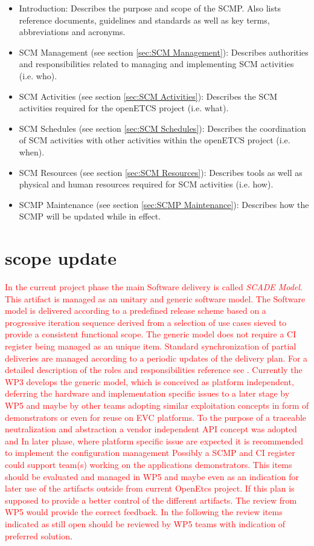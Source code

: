 \documentclass{template/openetcs_report}
\begin{document}
\vspace{-10pt}
\begin{itemize}
\item Introduction: Describes the purpose and scope of the SCMP. Also lists reference documents, guidelines and standards as well as key terms, abbreviations and acronyms.
\item SCM Management (see section \ref{sec:SCM Management}): Describes authorities and responsibilities related to managing and implementing SCM activities (i.e. who).
\item SCM Activities (see section \ref{sec:SCM Activities}): Describes the SCM activities required for the openETCS project (i.e. what).
\item SCM Schedules (see section \ref{sec:SCM Schedules}): Describes the coordination of SCM activities with other activities within the openETCS project (i.e. when).
\item SCM Resources (see section \ref{sec:SCM Resources}): Describes tools as well as physical and human resources required for SCM activities (i.e. how).
\item SCMP Maintenance (see section \ref{sec:SCMP Maintenance}): Describes how the SCMP will be updated while in effect.
\end{itemize}


\section{scope update}
\textcolor{red}{
In the current project phase the main Software delivery is called \emph{ SCADE Model}. This artifact is managed as an unitary and generic software model. The Software model is delivered according to a predefined release scheme based on a progressive iteration sequence derived from a selection of use cases sieved to provide a consistent functional scope. The generic model does not require a CI register being managed as an unique item. Standard synchronization of partial deliveries are managed according to a periodic updates of the delivery plan. For a detailed description of the roles and responsibilities reference see \cite{ADD}.
Currently the WP3 develops the generic model, which is conceived as platform independent, deferring the hardware and implementation specific issues to a later stage by WP5 and maybe by other teams adopting similar exploitation concepts in form of demonstrators or even for reuse on EVC platforms. To the purpose of a traceable neutralization and abstraction a vendor independent API concept was adopted and 
In later phase, where platform specific issue are expected it is recommended to implement the configuration management
  Possibly a SCMP and CI register could support team(s) working on the applications demonstrators. This items should be evaluated and managed in WP5 and maybe even as an indication for later use of the artifacts outside from current OpenEtcs project. If this plan is supposed to provide a better control of the different artifacts. The review from WP5 would provide the correct feedback. In the following the review items indicated as still open should be reviewed by WP5 teams with indication of preferred solution}.
\end{document}
